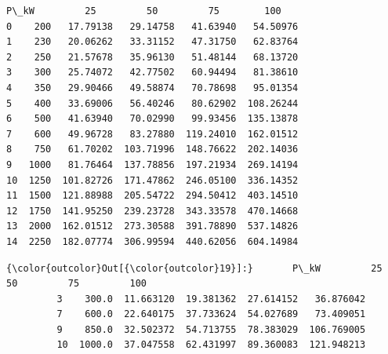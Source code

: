 \documentclass[11pt]{article}
\begin{document}
    \begin{Verbatim}[commandchars=\\\{\}]
    P\_kW         25         50         75        100
0    200   17.79138   29.14758   41.63940   54.50976
1    230   20.06262   33.31152   47.31750   62.83764
2    250   21.57678   35.96130   51.48144   68.13720
3    300   25.74072   42.77502   60.94494   81.38610
4    350   29.90466   49.58874   70.78698   95.01354
5    400   33.69006   56.40246   80.62902  108.26244
6    500   41.63940   70.02990   99.93456  135.13878
7    600   49.96728   83.27880  119.24010  162.01512
8    750   61.70202  103.71996  148.76622  202.14036
9   1000   81.76464  137.78856  197.21934  269.14194
10  1250  101.82726  171.47862  246.05100  336.14352
11  1500  121.88988  205.54722  294.50412  403.14510
12  1750  141.95250  239.23728  343.33578  470.14668
13  2000  162.01512  273.30588  391.78890  537.14826
14  2250  182.07774  306.99594  440.62056  604.14984

    \end{Verbatim}

\begin{Verbatim}[commandchars=\\\{\}]
{\color{outcolor}Out[{\color{outcolor}19}]:}       P\_kW         25         50         75         100
         3    300.0  11.663120  19.381362  27.614152   36.876042
         7    600.0  22.640175  37.733624  54.027689   73.409051
         9    850.0  32.502372  54.713755  78.383029  106.769005
         10  1000.0  37.047558  62.431997  89.360083  121.948213
\end{Verbatim}
            
\end{document}
